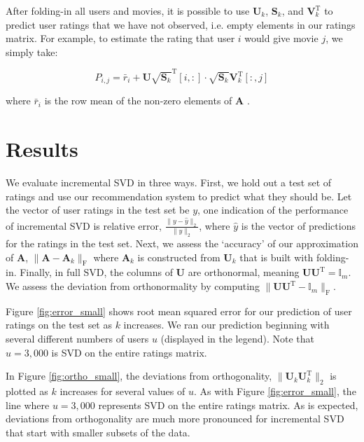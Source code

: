 \documentclass{article} %
\newcommand{\A}{\mathbf{A}}
\newcommand{\T}{\textrm{T}}
\begin{document}
After folding-in all users and movies, it is possible to use $\mathbf{U}_k$, $\mathbf{S}_k$, and $\mathbf{V}_k^{\T}$ to predict user ratings that we have not observed, i.e. empty elements in our ratings matrix.
For example, to estimate the rating that user $i$ would give movie $j$, we simply take:

$$P_{i,j} = \bar{r}_i + \mathbf{U}\sqrt{\mathbf{S}_k}^{\T}[i,:]
\cdot \sqrt{\mathbf{S}_k}\mathbf{V}_k^{\T}[:,j]$$

where $\bar{r}_i$ is the row mean of the non-zero elements of $\A$ \citep{sarwar2002}.

\section{Results}

We evaluate incremental SVD in three ways.
First, we hold out a test set of ratings and use our recommendation system to predict what they should be.
Let the vector of user ratings in the test set be $y$, one indication of
the performance of incremental SVD is relative error, $\frac{\|y - \hat{y}\|_2}{\|y\|_2}$, where $\hat{y}$ is the vector of predictions for the ratings in the test set.
Next, we assess the `accuracy' of our approximation of $\A$, $\|\A - \A_k\|_{\textrm{F}}$ where $\A_k$ is constructed from $\mathbf{U}_k$ that is built with folding-in.
Finally, in full SVD, the columns of $\mathbf{U}$ are orthonormal, meaning $\mathbf{U}\mathbf{U}^{\T} = \mathbb{I}_m$.
We assess the deviation from orthonormality by computing $\|\mathbf{U}\mathbf{U}^{\T} - \mathbb{I}_m\|_{\textrm{F}}$.

Figure \ref{fig:error_small} shows root mean squared error for our prediction of user ratings on the test set as $k$ increases.
We ran our prediction beginning with several different numbers of 
users $u$ (displayed in the legend).
Note that $u = 3,000$ is SVD on the entire ratings matrix.

In Figure \ref{fig:ortho_small}, the deviations from orthogonality, 
$\|\mathbf{U}_k\mathbf{U}_k^{\T}\|_2$ is plotted as $k$ increases for several values of $u$. As with Figure \ref{fig:error_small}, the line where $u = 3,000$ represents SVD on the entire ratings matrix. As is expected, deviations from orthogonality are much more pronounced for incremental SVD that start with smaller subsets of the data.
\end{document}
